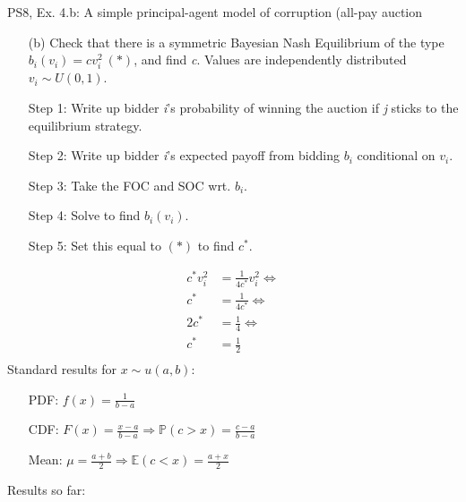 \begin{frame}{PS8, Ex. 4.b: A simple principal-agent model of corruption (all-pay auction}
    \begin{itemize}
      \item[(b)] Check that there is a symmetric Bayesian Nash Equilibrium of the type $b_i(v_i) = cv_i^2\ (*)$, and find \textit{c}. Values are independently distributed $v_i\sim U(0, 1)$.
    \end{itemize} \vspace{-8pt}
    \begin{multicols}{2}
      \begin{itemize}
        \item[Step 1:] Write up bidder \textit{i}'s probability of winning the auction if \textit{j} sticks to the equilibrium strategy.
        \item[Step 2:] Write up bidder \textit{i}'s expected payoff from bidding $b_i$ conditional on $v_i$.
        \item[Step 3:] Take the FOC and SOC wrt. $b_i$.
        \item[Step 4:] Solve to find $b_i(v_i)$.
        \item[Step 5:] Set this equal to $(*)$ to find $c^*$.
      \end{itemize} \vspace{-6pt}
      \begin{align*}
        c^*v_i^2&=\frac{1}{4c^*}v_i^2\Leftrightarrow\\
        c^*&=\frac{1}{4c^*}\Leftrightarrow\\
        2c^*&=\frac{1}{4}\Leftrightarrow\\
        c^*&=\frac{1}{2}\\
      \end{align*}
      \vfill\null\columnbreak
      Standard results for $x\sim u(a, b):$ \vspace{-6pt}
      \begin{itemize}
        \item[PDF:] $f(x)=\frac{1}{b-a}$
        \item[CDF:] $F(x)=\frac{x-a}{b-a}\Rightarrow\mathbb{P}(c>x)=\frac{c-a}{b-a}$
        \item[Mean:] $\mu=\frac{a+b}{2}\Rightarrow\mathbb{E}(c<x)=\frac{a+x}{2}$
      \end{itemize}
      \vspace{-6pt}
      Results so far: \vspace{-6pt}
      \begin{align*}

\end{align*}
\end{multicols}
\end{frame}

